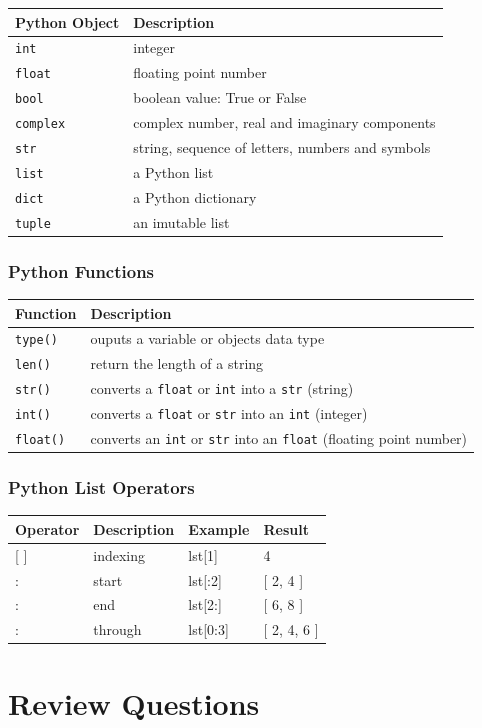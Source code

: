 \documentclass{book}
\begin{document}
\begin{longtable}[]{@{}ll@{}}
\toprule
Python Object & Description\tabularnewline
\midrule
\endhead
\lstinline!int! & integer\tabularnewline
\lstinline!float! & floating point number\tabularnewline
\lstinline!bool! & boolean value: True or False\tabularnewline
\lstinline!complex! & complex number, real and imaginary
components\tabularnewline
\lstinline!str! & string, sequence of letters, numbers and
symbols\tabularnewline
\lstinline!list! & a Python list\tabularnewline
\lstinline!dict! & a Python dictionary\tabularnewline
\lstinline!tuple! & an imutable list\tabularnewline
\bottomrule
\end{longtable}

\subsubsection{Python Functions}\label{python-functions}

\begin{longtable}[]{@{}ll@{}}
\toprule
Function & Description\tabularnewline
\midrule
\endhead
\lstinline!type()! & ouputs a variable or objects data
type\tabularnewline
\lstinline!len()! & return the length of a string\tabularnewline
\lstinline!str()! & converts a \lstinline!float! or \lstinline!int! into
a \lstinline!str! (string)\tabularnewline
\lstinline!int()! & converts a \lstinline!float! or \lstinline!str! into
an \lstinline!int! (integer)\tabularnewline
\lstinline!float()! & converts an \lstinline!int! or \lstinline!str!
into an \lstinline!float! (floating point number)\tabularnewline
\bottomrule
\end{longtable}

\subsubsection{Python List Operators}\label{python-list-operators}

\begin{longtable}[]{@{}llll@{}}
\toprule
Operator & Description & Example & Result\tabularnewline
\midrule
\endhead
{[} {]} & indexing & lst{[}1{]} & 4\tabularnewline
: & start & lst{[}:2{]} & {[} 2, 4 {]}\tabularnewline
: & end & lst{[}2:{]} & {[} 6, 8 {]}\tabularnewline
: & through & lst{[}0:3{]} & {[} 2, 4, 6 {]}\tabularnewline
\bottomrule
\end{longtable}

    \section{Review Questions}\label{review-questions}
\end{document}
